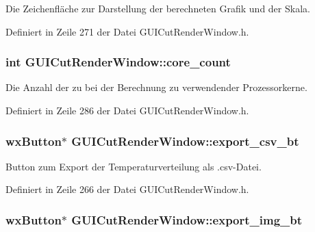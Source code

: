 Die Zeichenfläche zur Darstellung der berechneten Grafik und der Skala. 



Definiert in Zeile 271 der Datei G\-U\-I\-Cut\-Render\-Window.\-h.

\hypertarget{classGUICutRenderWindow_a365103460aeafd2173c0a9360cc0caa1}{
\subsubsection[{core\-\_\-count}]{\setlength{\rightskip}{0pt plus 5cm}int G\-U\-I\-Cut\-Render\-Window\-::core\-\_\-count\hspace{0.3cm}{\ttfamily [private]}}}\label{classGUICutRenderWindow_a365103460aeafd2173c0a9360cc0caa1}


Die Anzahl der zu bei der Berechnung zu verwendender Prozessorkerne. 



Definiert in Zeile 286 der Datei G\-U\-I\-Cut\-Render\-Window.\-h.

\hypertarget{classGUICutRenderWindow_a1613155eefe8309903858f9427b263de}{
\subsubsection[{export\-\_\-csv\-\_\-bt}]{\setlength{\rightskip}{0pt plus 5cm}wx\-Button$\ast$ G\-U\-I\-Cut\-Render\-Window\-::export\-\_\-csv\-\_\-bt\hspace{0.3cm}{\ttfamily [private]}}}\label{classGUICutRenderWindow_a1613155eefe8309903858f9427b263de}


Button zum Export der Temperaturverteilung als .csv-\/\-Datei. 



Definiert in Zeile 266 der Datei G\-U\-I\-Cut\-Render\-Window.\-h.

\hypertarget{classGUICutRenderWindow_ac0b26b746d6339154256d81da8cd7aed}{
\subsubsection[{export\-\_\-img\-\_\-bt}]{\setlength{\rightskip}{0pt plus 5cm}wx\-Button$\ast$ G\-U\-I\-Cut\-Render\-Window\-::export\-\_\-img\-\_\-bt\hspace{0.3cm}{\ttfamily [private]}}}\label{classGUICutRenderWindow_ac0b26b746d6339154256d81da8cd7aed}


